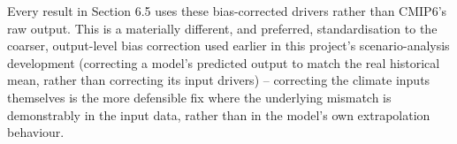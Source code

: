 Every result in Section 6.5 uses these bias-corrected drivers rather than CMIP6's raw output. This
is a materially different, and preferred, standardisation to the coarser, output-level bias
correction used earlier in this project's scenario-analysis development (correcting a model's
predicted output to match the real historical mean, rather than correcting its input drivers) --
correcting the climate inputs themselves is the more defensible fix where the underlying mismatch is
demonstrably in the input data, rather than in the model's own extrapolation behaviour.





